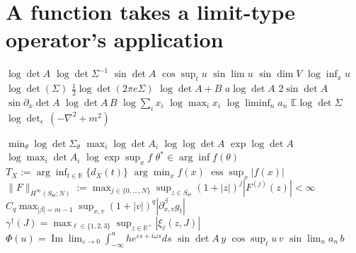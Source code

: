 \documentclass{article}
\begin{document}
\section{A function takes a limit-type operator's application}
$\log\det A$ $\log\det\Sigma^{-1}$ $\sin\det A$ $\cos\sup_t u$ $\sin\lim u$ $\sin\dim V$ $\log\inf_x u$ $\log\det(\Sigma)$
$\frac12\log\det(2\pi e\Sigma)$ $\log\det A+B$ $a\log\det A$ $2\sin\det A$ $\sin\partial_x\det A$ $\log\det A\,B$
$\log\sum_i x_i$ $\log\max_i x_i$ $\log\liminf_n a_n$ $\mathbb{E}\log\det\Sigma$ $\log{\det}_{\epsilon}\,\left(-\nabla^{2}+m^{2}\right)$

$\min_\theta\log\det\Sigma_\theta$ $\max_i\log\det A_i$ $\log\log\det A$ $\exp\log\det A$ $\log\max_i\det A_i$ $\log\exp\sup_x f$
$\theta^{*}\in\arg\inf f(\theta)$ $T_{X}:=\arg\inf_{t\in\mathbb{R}}\{d_{X}(t)\}$ $\arg\min_x f(x)$ $\operatorname{ess}\sup_x|f(x)|$
$\|F\|_{H^{\infty}(S_{\Theta};N)}:=\max_{j\in\{0,\ldots,N\}}\sup_{z\in\overline{S_{\Theta}}}(1+|z|)^{j}|F^{(j)}(z)|<\infty$
$C_{q}\max_{|\beta|=m-1}\sup_{x,v}(1+|v|)^{q}|\partial_{x,v}^{\beta}g_{t}|$ $\gamma^{\dagger}(J)=\max_{\ell\in\{1,2,3\}}\sup_{z\in\mathbb{R}^{+}}|\xi_{\ell}(z,J)|$
$\Phi(u)=\operatorname{Im}\lim_{\varepsilon\to 0}\int_{-\infty}^{u}he^{\varepsilon s+i\omega s}ds$
$\sin\det A\,y$ $\cos\sup_t u\,v$ $\sin\lim_n a_n\,b$
\end{document}
